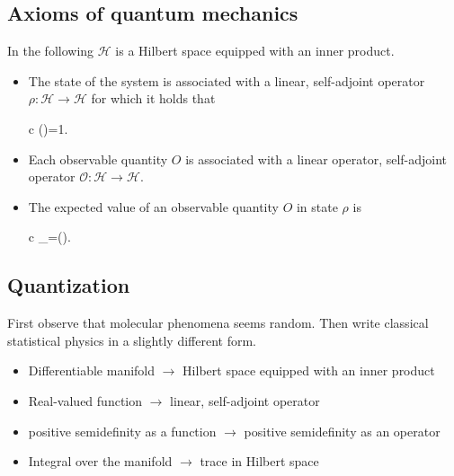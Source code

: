 \documentclass[11pt,oneside,%
]{memoir}
\newenvironment{eqna}{\begin{IEEEeqnarray}{c}}{\end{IEEEeqnarray}\ignorespacesafterend}
\theoremstyle{definition}
\DeclareMathOperator{\Tr}{Tr}
\begin{document}
\subsection{Axioms of quantum mechanics}

In the following \(\mathcal{H}\) is a Hilbert space equipped with an inner product.

\begin{itemize}
    \item The state of the system is associated with a linear, self-adjoint operator \(\rho:\mathcal{H}\rightarrow\mathcal{H}\) for which it holds that
    \begin{eqna}
        \braket{\psi|\rho|\psi}\qquad{}\qquad\Tr(\rho)=1.\nonumber
    \end{eqna}
    \item Each observable quantity \(O\) is associated with a linear operator, self-adjoint operator \(\mathcal{O}:\mathcal{H}\rightarrow\mathcal{H}\).
    \item The expected value of an observable quantity \(O\) in state \(\rho\) is
    \begin{eqna}
        \langle{}\rangle_\rho=\Tr(\rho{}).\nonumber
    \end{eqna}
\end{itemize}

\subsection{Quantization}

First observe that molecular phenomena seems random. Then write classical statistical physics in a slightly different form.

\begin{itemize}
    \item Differentiable manifold \(\rightarrow\) Hilbert space equipped with an inner product
    \item Real-valued function \(\rightarrow\) linear, self-adjoint operator
    \item positive semidefinity as a function \(\rightarrow\) positive semidefinity as an operator
    \item Integral over the manifold \(\rightarrow\) trace in Hilbert space
\end{itemize}
\end{document}
